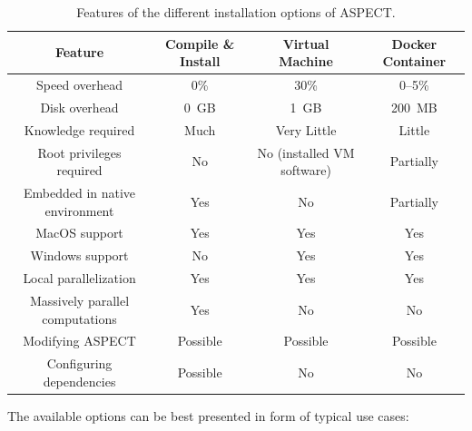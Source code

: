 \documentclass{article}
\newcommand{\aspect}{\textsc{ASPECT}}
\begin{document}
\begin{table}[htb]
  \center
  \begin{tabular}{|c|ccc|}
    \hline
    Feature & Compile \& Install & Virtual Machine & Docker Container \\
    \hline
    Speed overhead          & 0\%   & 30\%     & 0--5\%    \\
    Disk overhead           & 0~GB  & 1~GB     & 200~MB       \\
    Knowledge required      & Much  & Very Little & Little    \\
    Root privileges required & No   & No (installed VM software) & Partially  \\
    Embedded in native environment & Yes & No  & Partially    \\
    MacOS support           & Yes   & Yes      & Yes    \\
    Windows support         & No    & Yes      & Yes    \\
    Local parallelization   & Yes   & Yes      & Yes            \\ 
    Massively parallel computations & Yes & No & No \\ 
    Modifying ASPECT        & Possible & Possible & Possible \\
    Configuring dependencies & Possible & No   & No \\ \hline
  \end{tabular}
  \caption{Features of the different installation options of \aspect{}.}
  \label{tab:install-options}
\end{table}

The available options can be best presented in form of typical use cases:
\end{document}
